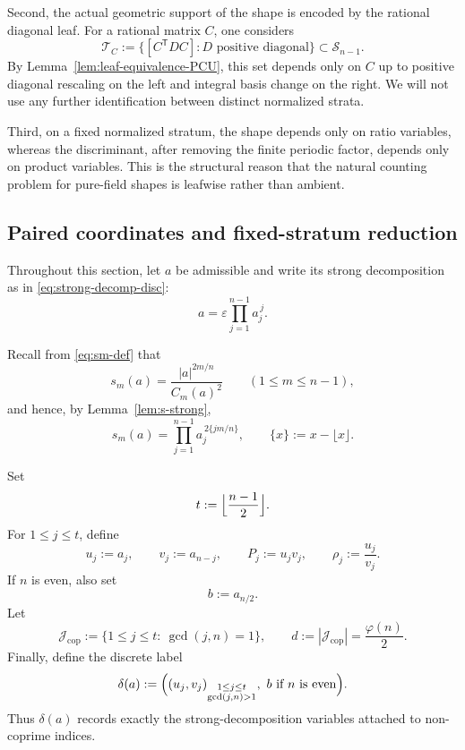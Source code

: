 \documentclass[11pt,letterpaper]{amsart}
\theoremstyle{plain}
\theoremstyle{definition}
\begin{document}
Second, the actual geometric support of the shape is encoded by the rational
diagonal leaf. For a rational matrix \(C\), one considers
\[
\mathcal T_C
:=
\{[C^{\mathsf T}DC]: D \text{ positive diagonal}\}
\subset \mathscr S_{n-1}.
\]
By Lemma~\ref{lem:leaf-equivalence-PCU}, this set depends only on \(C\) up to
positive diagonal rescaling on the left and integral basis change on the
right. We will not use any further identification between distinct normalized
strata.

Third, on a fixed normalized stratum, the shape depends only on ratio variables,
whereas the discriminant, after removing the finite periodic factor, depends
only on product variables.  This is the structural reason that the natural
counting problem for pure-field shapes is leafwise rather than ambient.

\subsection{Paired coordinates and fixed-stratum reduction}

Throughout this section, let \(a\) be admissible and write its strong
decomposition as in \eqref{eq:strong-decomp-disc}:
\[
a=\varepsilon\prod_{j=1}^{n-1} a_j^{\,j}.
\]

Recall from \eqref{eq:sm-def} that
\[
s_m(a)=\frac{|a|^{2m/n}}{C_m(a)^2}
\qquad (1\le m\le n-1),
\]
and hence, by Lemma~\ref{lem:s-strong},
\begin{equation}\label{eq:s-strong-paired}
s_m(a)=\prod_{j=1}^{n-1} a_j^{\,2\{jm/n\}},
\qquad
\{x\}:=x-\lfloor x\rfloor.
\end{equation}

Set
\[
t:=\Bigl\lfloor \frac{n-1}{2}\Bigr\rfloor.
\]
For \(1\le j\le t\), define
\[
u_j:=a_j,\qquad
v_j:=a_{n-j},\qquad
P_j:=u_jv_j,\qquad
\rho_j:=\frac{u_j}{v_j}.
\]
If \(n\) is even, also set
\[
b:=a_{n/2}.
\]
Let
\[
\mathcal J_{\mathrm{cop}}
:=
\{1\le j\le t:\ \gcd(j,n)=1\},
\qquad
d:=|\mathcal J_{\mathrm{cop}}|=\frac{\varphi(n)}{2}.
\]
Finally, define the discrete label
\begin{equation}\label{eq:delta-fixed-leaf}
\delta(a)
:=
\Bigl(
(u_j,v_j)_{\substack{1\le j\le t\\ \gcd(j,n)>1}},
\ b\text{ if }n\text{ is even}
\Bigr).
\end{equation}
Thus \(\delta(a)\) records exactly the strong-decomposition variables attached
to non-coprime indices.
\end{document}
